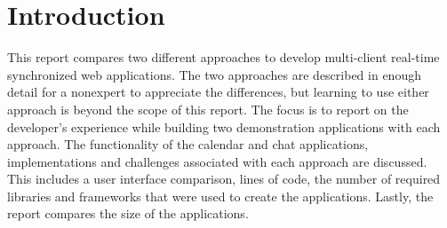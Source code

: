 
\chapter{Introduction}
\label{chap:introduction}
This report compares two different approaches to develop multi-client real-time synchronized web applications. The two approaches are described in enough detail for a nonexpert to appreciate the differences, but learning to use either approach is beyond the scope of this report. The focus is to report on the developer’s experience while building two demonstration applications with each approach. The functionality of the calendar and chat applications, implementations and  challenges associated with each approach are discussed. This includes a user interface comparison, lines of code, the number of required libraries and frameworks that were used to create the applications. Lastly, the report compares the size of the applications.



